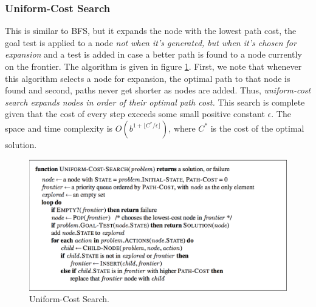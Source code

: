 \documentclass[twoside]{article}
\begin{document}
\subsubsection{Uniform-Cost Search}
This is similar to BFS, but it expands the node with the lowest path cost, the
goal test is applied to a node \emph{not when it's generated, but when it's
chosen for expansion} and a test is added in case a better path is found to a
node currently on the frontier. The algorithm is given in figure \ref{fig:ucs}.
First, we note that whenever this algorithm selects a node for expansion, the 
optimal path to that node is found and second, paths never get shorter as
nodes are added. Thus, \emph{uniform-cost search expands nodes in order of 
their optimal path cost.} This search is complete given that the cost of every
step exceeds some small positive constant \(\epsilon\). The space and time
complexity is \(O(b^{1+\lfloor C^*/\epsilon \rfloor})\), where \(C^*\) is the
cost of the optimal solution.
\begin{figure}
  \includegraphics[width=\linewidth]{uniform.png}
  \caption{Uniform-Cost Search.}
  \label{fig:ucs}
\end{figure}
\end{document}
